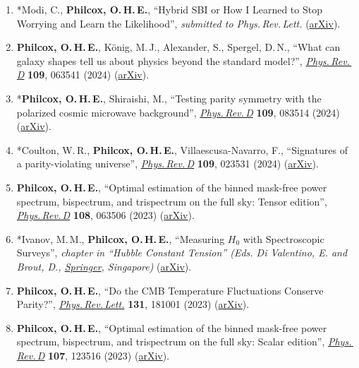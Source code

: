 \begin{enumerate}
    \item *Modi, C., \textbf{Philcox, O.\,H.\,E.}, ``Hybrid SBI or How I Learned to Stop Worrying and Learn the Likelihood'', \textit{submitted to Phys.\,Rev.\,Lett.} (\href{https://arxiv.org/abs/2309.10270}{arXiv}).
    \item \textbf{Philcox, O.\,H.\,E.}, K\"onig, M.\,J., Alexander, S., Spergel, D.\,N., ``What can galaxy shapes tell us about physics beyond the standard model?'', \href{https://doi.org/10.1103/PhysRevD.109.063541}{\textit{Phys.\,Rev.\,D}} \textbf{109}, 063541 (2024) (\href{https://arxiv.org/abs/2309.08653}{arXiv}).
    \item *\textbf{Philcox, O.\,H.\,E.}, Shiraishi, M., ``Testing parity symmetry with the polarized cosmic microwave background'', \href{https://doi.org/10.1103/PhysRevD.109.083514}{\textit{Phys.\,Rev.\,D}} \textbf{109}, 083514 (2024) (\href{https://arxiv.org/abs/2308.03831}{arXiv}).
    \item *Coulton, W.\,R., \textbf{Philcox, O.\,H.\,E.}, Villaescusa-Navarro, F., ``Signatures of a parity-violating universe'', \href{https://doi.org/10.1103/PhysRevD.109.023531}{\textit{Phys.\,Rev.\,D}} \textbf{109}, 023531 (2024) (\href{https://arxiv.org/abs/2306.11782}{arXiv}).
    \item \textbf{Philcox, O.\,H.\,E.}, ``Optimal estimation of the binned mask-free power spectrum, bispectrum, and trispectrum on the full sky: Tensor edition'', \href{https://doi.org/10.1103/PhysRevD.108.063506}{\textit{Phys.\,Rev.\,D}} \textbf{108}, 063506 (2023) (\href{https://arxiv.org/abs/2306.03915}{arXiv}).
    \item *Ivanov, M.\,M., \textbf{Philcox, O.\,H.\,E.}, ``Measuring $H_0$ with Spectroscopic Surveys'', \textit{chapter in ``Hubble Constant Tension'' (Eds. Di Valentino, E. and Brout, D., \href{https://link.springer.com/book/10.1007/978-981-99-0177-7}{Springer}, Singapore)} (\href{https://arxiv.org/abs/2305.07977}{arXiv}).
    \item \textbf{Philcox, O.\,H.\,E.}, ``Do the CMB Temperature Fluctuations Conserve Parity?'', \href{https://doi.org/10.1103/PhysRevLett.131.181001}{\textit{Phys.\,Rev.\,Lett.}} \textbf{131}, 181001 (2023) (\href{https://arxiv.org/abs/2303.12106}{arXiv}).
    \item \textbf{Philcox, O.\,H.\,E.}, ``Optimal estimation of the binned mask-free power spectrum, bispectrum, and trispectrum on the full sky: Scalar edition'', \href{https://doi.org/10.1103/PhysRevD.107.123516}{\textit{Phys.\,Rev.\,D}} \textbf{107}, 123516 (2023) (\href{https://arxiv.org/abs/2303.08828}{arXiv}).

\end{enumerate}
